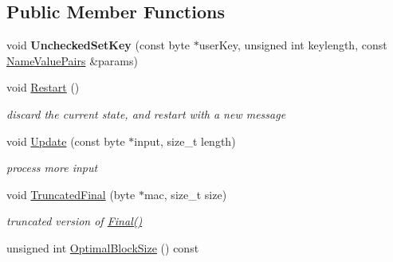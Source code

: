 \subsection*{Public Member Functions}
\begin{DoxyCompactItemize}
\item 
\hypertarget{class_h_m_a_c___base_a3fa7312a806642d28e9c849b8e2c17dc}{
void {\bfseries UncheckedSetKey} (const byte $\ast$userKey, unsigned int keylength, const \hyperlink{class_name_value_pairs}{NameValuePairs} \&params)}
\label{class_h_m_a_c___base_a3fa7312a806642d28e9c849b8e2c17dc}

\item 
\hypertarget{class_h_m_a_c___base_a7bdeb5438c920045d122017a6b4ab426}{
void \hyperlink{class_h_m_a_c___base_a7bdeb5438c920045d122017a6b4ab426}{Restart} ()}
\label{class_h_m_a_c___base_a7bdeb5438c920045d122017a6b4ab426}

\begin{DoxyCompactList}\small\item\em discard the current state, and restart with a new message \item\end{DoxyCompactList}\item 
\hypertarget{class_h_m_a_c___base_aefb8a1fb43ef8c9390ee89bbb41c83af}{
void \hyperlink{class_h_m_a_c___base_aefb8a1fb43ef8c9390ee89bbb41c83af}{Update} (const byte $\ast$input, size\_\-t length)}
\label{class_h_m_a_c___base_aefb8a1fb43ef8c9390ee89bbb41c83af}

\begin{DoxyCompactList}\small\item\em process more input \item\end{DoxyCompactList}\item 
\hypertarget{class_h_m_a_c___base_a5454c1446981ddee322b0521c6ebd375}{
void \hyperlink{class_h_m_a_c___base_a5454c1446981ddee322b0521c6ebd375}{TruncatedFinal} (byte $\ast$mac, size\_\-t size)}
\label{class_h_m_a_c___base_a5454c1446981ddee322b0521c6ebd375}

\begin{DoxyCompactList}\small\item\em truncated version of \hyperlink{class_hash_transformation_aa0b8c7a110d8968268fd02ec32b9a8e8}{Final()} \item\end{DoxyCompactList}\item 
\hypertarget{class_h_m_a_c___base_aff95ee2467f75accc29644b77f7ce781}{
unsigned int \hyperlink{class_h_m_a_c___base_aff95ee2467f75accc29644b77f7ce781}{OptimalBlockSize} () const }
\label{class_h_m_a_c___base_aff95ee2467f75accc29644b77f7ce781}


\end{DoxyCompactItemize}
